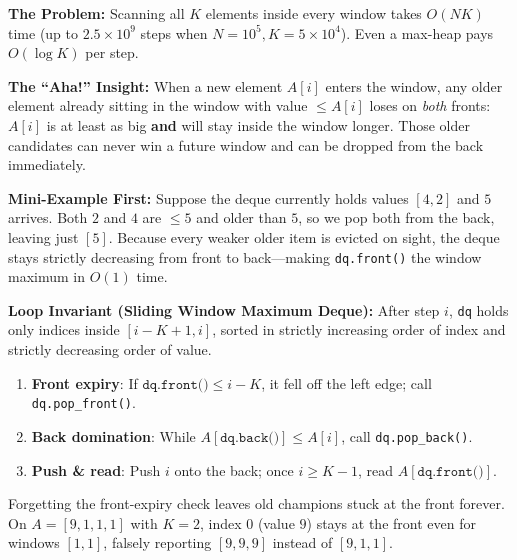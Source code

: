 \documentclass[11pt,a4paper]{article}
\theoremstyle{definition}
\newcommand{\painbeat}{\textbf{\color{accentamber}The Problem:} }
\newcommand{\ahabeat}{\textbf{\color{accentteal}The ``Aha!'' Insight:} }
\newcommand{\examplebeat}{\textbf{\color{primaryblue}Mini-Example First:} }
\newcommand{\invariantbeat}[1]{\par\noindent\textbf{\color{accentteal}Loop Invariant (#1):} }
\begin{document}
\painbeat Scanning all $K$ elements inside every window takes $O(NK)$ time (up to $2.5 \times 10^9$ steps when $N = 10^5, K = 5 \times 10^4$). Even a max-heap pays $O(\log K)$ per step.

\ahabeat When a new element $A[i]$ enters the window, any older element already sitting in the window with value $\le A[i]$ loses on \emph{both} fronts: $A[i]$ is at least as big \textbf{and} will stay inside the window longer. Those older candidates can never win a future window and can be dropped from the back immediately.

\examplebeat Suppose the deque currently holds values $[4, 2]$ and $5$ arrives. Both $2$ and $4$ are $\le 5$ and older than $5$, so we pop both from the back, leaving just $[5]$. Because every weaker older item is evicted on sight, the deque stays strictly decreasing from front to back---making \texttt{dq.front()} the window maximum in $O(1)$ time.

\invariantbeat{Sliding Window Maximum Deque} After step $i$, \texttt{dq} holds only indices inside $[i - K + 1, i]$, sorted in strictly increasing order of index and strictly decreasing order of value.

\begin{enumerate}
    \item \textbf{Front expiry}: If $\texttt{dq.front()} \le i - K$, it fell off the left edge; call \texttt{dq.pop\_front()}.
    \item \textbf{Back domination}: While $A[\texttt{dq.back()}] \le A[i]$, call \texttt{dq.pop\_back()}.
    \item \textbf{Push \& read}: Push $i$ onto the back; once $i \ge K - 1$, read $A[\texttt{dq.front()}]$.
\end{enumerate}

\begin{watchoutbox}
Forgetting the front-expiry check leaves old champions stuck at the front forever. On $A = [9, 1, 1, 1]$ with $K = 2$, index $0$ (value $9$) stays at the front even for windows $[1, 1]$, falsely reporting $[9, 9, 9]$ instead of $[9, 1, 1]$.
\end{watchoutbox}
\end{document}
